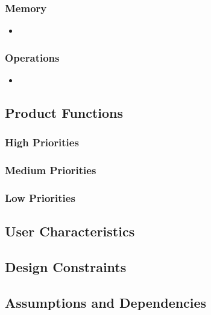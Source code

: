 \documentclass[ProjectRequirements.tex]{subfiles}
\begin{document}
		\subsubsection{Memory}
			\begin{itemize}\itemsep1pt
				\item 
			\end{itemize}
		
		\subsubsection{Operations}
			\begin{itemize}\itemsep1pt
				\item 
			\end{itemize}
		
	\subsection{Product Functions}
	
		\subsubsection{High Priorities}
		
		\subsubsection{Medium Priorities}
		
		\subsubsection{Low Priorities}
		
	\subsection{User Characteristics}
	
	\subsection{Design Constraints}
	
	\subsection{Assumptions and Dependencies}
	
\end{document}
